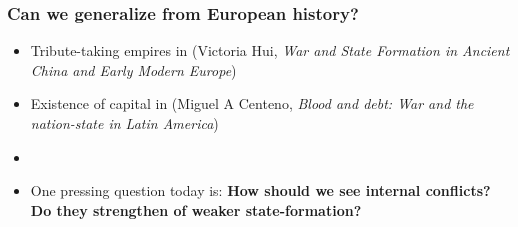 \documentclass[aspectratio=43]{beamer}
\begin{document}
\begin{frame}
\frametitle{Can we generalize from European history?}
\centering

\begin{itemize}[<+->]
  \item Tribute-taking empires in  (Victoria Hui, \textit{War and State Formation in Ancient China and Early Modern Europe})
  \item Existence of capital in  (Miguel A Centeno, \textit{Blood and debt: War and the nation-state in Latin America})
  \item[]
  \item One pressing question today is: \textbf{How should we see internal conflicts? Do they strengthen of weaker state-formation?}
\end{itemize}

\end{frame}
\end{document}
